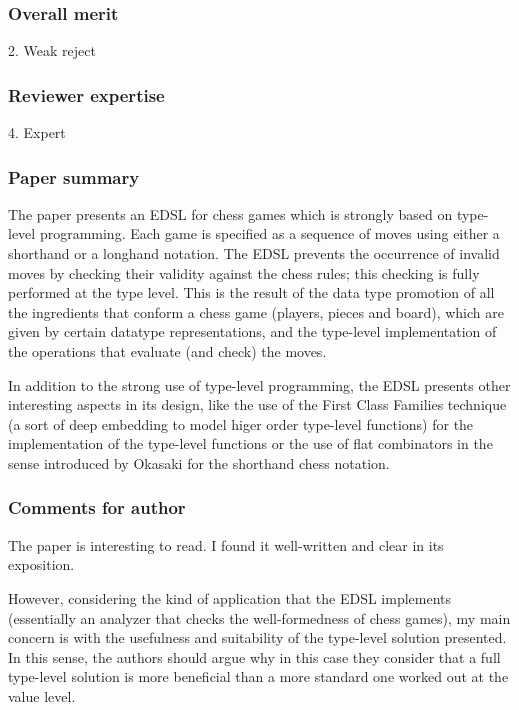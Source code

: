 \subsubsection{Overall merit}

2. Weak reject

\subsubsection{Reviewer expertise}

4. Expert

\subsubsection{Paper summary}

The paper presents an EDSL for chess games which is strongly based on type-level programming. Each game is specified as a sequence of moves using either a shorthand or a longhand notation. The EDSL prevents the occurrence of invalid moves by checking their validity against the chess rules; this checking is fully performed at the type level. This is the result of the data type promotion of all the ingredients that conform a chess game (players, pieces and board), which are given by certain datatype representations, and the type-level implementation of the operations that evaluate (and check) the moves.

In addition to the strong use of type-level programming, the EDSL presents other interesting aspects in its design, like the use of the First Class Families technique (a sort of deep embedding to model higer order type-level functions) for the implementation of the type-level functions or the use of flat combinators in the sense introduced by Okasaki for the shorthand chess notation.

\subsubsection{Comments for author}

The paper is interesting to read. I found it well-written and clear in its exposition.

However, considering the kind of application that the EDSL implements (essentially an analyzer that checks the well-formedness of chess games), my main concern is with the usefulness and suitability of the type-level solution presented. In this sense, the authors should argue why in this case they consider that a full type-level solution is more beneficial than a more standard one worked out at the value level.

